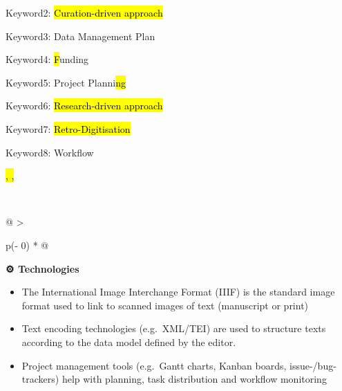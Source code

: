 \documentclass[
  letterpaper,
  DIV=11,
  numbers=noendperiod]{scrreprt}
\begin{document}
Keyword2: \hl{Curation-driven approach}

Keyword3: Data Management Plan

Keyword4: \hl{F}unding

Keyword5: Project Planni\hl{ng}

Keyword6: \hl{Research-driven approach}

Keyword7: \hl{Retro-Digitisation}

Keyword8: Workflow

\hl{, ,} ~

~

\begin{longtable}[]{@{}
  >{\raggedright\arraybackslash}p{(\columnwidth - 0\tabcolsep) * }@{}}
\toprule\noalign{}
\begin{minipage}[b]{\linewidth}\raggedright
\textbf{⚙️ Technologies} \textbar{}

\begin{itemize}
\item
  The International Image Interchange Format (IIIF) is the standard
  image format used to link to scanned images of text (manuscript or
  print)
\item
  Text encoding technologies (e.g.~XML/TEI) are used to structure texts
  according to the data model defined by the editor.
\item
  Project management tools (e.g.~Gantt charts, Kanban boards,
  issue-/bug-trackers) help with planning, task distribution and
  workflow monitoring
\end{itemize}
\end{minipage} \\
\midrule\noalign{}
\endhead
\bottomrule\noalign{}
\endlastfoot
 \\
\end{longtable}

~
\end{document}
